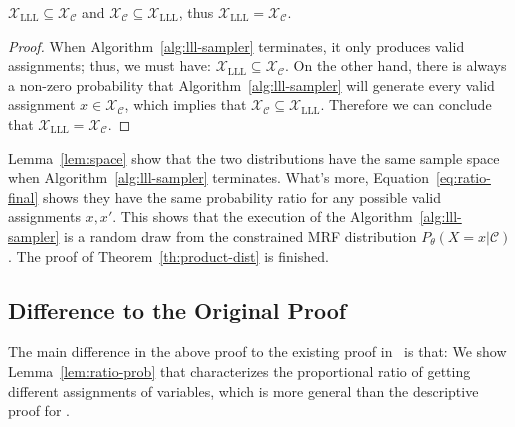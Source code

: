 \begin{lemma}\label{lem:space}
$\mathcal{X}_{\text{LLL}}\subseteq\mathcal{X}_{\mathcal{C}}$ and $\mathcal{X}_{\mathcal{C}}\subseteq\mathcal{X}_{\text{LLL}}$, thus $\mathcal{X}_{\text{LLL}}=\mathcal{X}_{\mathcal{C}}$.
\begin{proof}
When Algorithm~\ref{alg:lll-sampler} terminates, it only produces valid assignments; thus, we must have: $\mathcal{X}_{\text{LLL}}\subseteq\mathcal{X}_{\mathcal{C}}$. On the other hand,   there is always a non-zero probability that Algorithm~\ref{alg:lll-sampler} will generate every valid assignment $x\in\mathcal{X}_\mathcal{C}$, which implies that $\mathcal{X}_{\mathcal{C}}\subseteq\mathcal{X}_{\text{LLL}}$. Therefore we can conclude that $\mathcal{X}_{\text{LLL}}=\mathcal{X}_{\mathcal{C}}$.
\end{proof}
\end{lemma}
Lemma~\ref{lem:space} show that the two distributions have the same sample space when Algorithm~\ref{alg:lll-sampler} terminates. What's more, Equation~\eqref{eq:ratio-final} shows they have the same probability ratio for any possible valid assignments $x,x'$. This shows that the execution of the Algorithm~\ref{alg:lll-sampler} is a random draw from the constrained MRF distribution $P_{\theta}(X=x|\mathcal{C})$. The proof of Theorem~\ref{th:product-dist} is finished. 

\subsection{Difference to the Original Proof} 
 The main difference in the above proof to the existing proof in~\cite[Lemma 7]{DBLP:journals/jacm/GuoJL19} is that: We  show Lemma~\ref{lem:ratio-prob} that characterizes the proportional ratio of getting different assignments of variables, which is more general than the descriptive proof for \citet[Lemma 7]{DBLP:journals/jacm/GuoJL19}.


